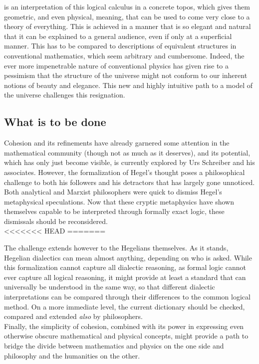 \documentclass{article}
\begin{document}
is an interpretation of this logical calculus in a concrete topos, which gives them geometric, and even
physical, meaning, that can be used to come very close to a theory of everything. This is achieved in
a manner that is so elegant and natural that it can be explained to a general audience, even if only at
a superficial manner. This has to be compared to descriptions of equivalent structures in conventional
mathematics, which seem arbitrary and cumbersome. Indeed, the ever more impenetrable nature of conventional
physics has given rise to a pessimism that the structure of the universe might not conform to our inherent
notions of beauty and elegance. This new and highly intuitive path to a model of the universe challenges
this resignation. \\


\subsection{What is to be done}
Cohesion and its refinements have already garnered some attention in the mathematical community (though
not as much as it deserves), and its potential, which has only just become visible, is currently explored
by Urs Schreiber and his associates. However, the formalization of Hegel's thought poses a philosophical
challenge to both his followers and his detractors that has largely gone unnoticed. Both analytical and
Marxist philosophers were quick to dismiss Hegel's metaphysical speculations. Now that these cryptic metaphysics
have shown themselves capable to be interpreted through formally exact logic, these dismissals should
be reconsidered. \\
<<<<<<< HEAD
=======

The challenge extends however to the Hegelians themselves. As it stands, Hegelian dialectics can mean
almost anything, depending on who is asked. While this formalization cannot capture all dialectic reasoning,
as formal logic cannot ever capture all logical reasoning, it might provide at least a standard that can
universally be understood in the same way, so that different dialectic interpretations can be compared
through their differences to the common logical method. On a more immediate level, the current dictionary
should be checked, compared and extended \emph{also} by philosophers. \\

Finally, the simplicity of cohesion, combined with its power in expressing even otherwise obscure mathematical
and physical concepts, might provide a path to bridge the divide between mathematics and physics on the
one side and philosophy and the humanities on the other.
\end{document}
